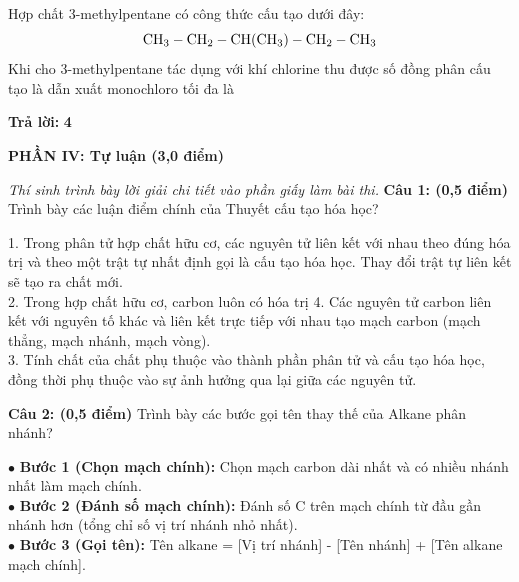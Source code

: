 \documentclass[11pt,a4paper]{article}
\begin{document}
\begin{ex}
Hợp chất 3-methylpentane có công thức cấu tạo dưới đây:
\[
\ce{CH3 - CH2 - CH(CH3) - CH2 - CH3}
\]
Khi cho 3-methylpentane tác dụng với khí chlorine thu được số đồng phân cấu tạo là dẫn xuất monochloro tối đa là
\par\textbf{Trả lời:} \textbf{\color{hfRed}4}
\end{ex}

\vspace{6pt}
{\large\bfseries\color{mainGreen} PHẦN IV: Tự luận (3,0 điểm)}

\textit{Thí sinh trình bày lời giải chi tiết vào phần giấy làm bài thi.}
\vspace{4pt}
\textbf{Câu 1: (0,5 điểm)} Trình bày các luận điểm chính của Thuyết cấu tạo hóa học?

\begin{tcolorbox}[colback=white,colframe=solBlue,arc=2mm,boxrule=0.5pt,title=\textbf{Lời giải Câu 1 (Tự luận)}]
1. Trong phân tử hợp chất hữu cơ, các nguyên tử liên kết với nhau theo đúng hóa trị và theo một trật tự nhất định gọi là cấu tạo hóa học. Thay đổi trật tự liên kết sẽ tạo ra chất mới.\\
2. Trong hợp chất hữu cơ, carbon luôn có hóa trị 4. Các nguyên tử carbon liên kết với nguyên tố khác và liên kết trực tiếp với nhau tạo mạch carbon (mạch thẳng, mạch nhánh, mạch vòng).\\
3. Tính chất của chất phụ thuộc vào thành phần phân tử và cấu tạo hóa học, đồng thời phụ thuộc vào sự ảnh hưởng qua lại giữa các nguyên tử.
\end{tcolorbox}

\vspace{4pt}
\textbf{Câu 2: (0,5 điểm)} Trình bày các bước gọi tên thay thế của Alkane phân nhánh?

\begin{tcolorbox}[colback=white,colframe=solBlue,arc=2mm,boxrule=0.5pt,title=\textbf{Lời giải Câu 2 (Tự luận)}]
$\bullet$ \textbf{Bước 1 (Chọn mạch chính):} Chọn mạch carbon dài nhất và có nhiều nhánh nhất làm mạch chính.\\
$\bullet$ \textbf{Bước 2 (Đánh số mạch chính):} Đánh số C trên mạch chính từ đầu gần nhánh hơn (tổng chỉ số vị trí nhánh nhỏ nhất).\\
$\bullet$ \textbf{Bước 3 (Gọi tên):} Tên alkane = [Vị trí nhánh] - [Tên nhánh] + [Tên alkane mạch chính].
\end{tcolorbox}
\end{document}
